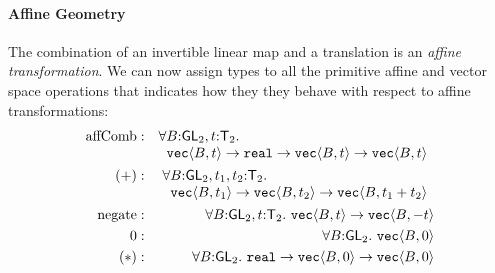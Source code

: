 \paragraph{Affine Geometry} The combination of an invertible linear
map and a translation is an \emph{affine transformation}. We can now
assign types to all the primitive affine and vector space operations
that indicates how they they behave with respect to affine
transformations:
\begin{eqnarray*}
  \mathrm{affComb} & : &
  \begin{array}[t]{@{}l}
    \forall B \mathord: \SynGL{2}, t \mathord: \SynTransl{2}.\\
    \hspace{0.2cm} \tyPrim{vec}{B,t} \to \tyPrimNm{real} \to \tyPrim{vec}{B,t} \to \tyPrim{vec}{B,t}
  \end{array}
  \\
  (+) & : &
  \begin{array}[t]{@{}l}
    \forall B \mathord: \SynGL{2}, t_1,t_2 \mathord: \SynTransl{2}. \\
    \hspace{0.2cm}\tyPrim{vec}{B,t_1} \to \tyPrim{vec}{B,t_2} \to \tyPrim{vec}{B,t_1 + t_2}
  \end{array}
  \\
  \mathrm{negate} & : & \forall B \mathord: \SynGL{2}, t \mathord: \SynTransl{2}.\ \tyPrim{vec}{B,t} \to \tyPrim{vec}{B,-t} \\
  0 & : & \forall B \mathord: \SynGL{2}.\ \tyPrim{vec}{B,0} \\
  (*) & : & \forall B \mathord: \SynGL{2}.\ \tyPrimNm{real} \to \tyPrim{vec}{B,0} \to \tyPrim{vec}{B,0}
\end{eqnarray*}

